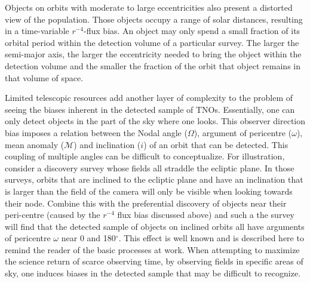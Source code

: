 \documentclass{aastex62}
\begin{document}
Objects on orbits with moderate to large eccentricities also present a distorted view of the population.  Those objects occupy a range of solar distances, resulting in a time-variable $r^{-4}$-flux bias. An object may only spend a small fraction of its orbital period within the detection volume of a particular survey. The larger the semi-major axis, the larger the eccentricity needed to bring the object within the detection volume and the smaller the fraction of the orbit that object remains in that volume of space.

Limited telescopic resources add another layer of complexity to the problem of seeing the biases inherent in the detected sample of TNOs.  Essentially, one can only detect objects in the part of the sky where one looks.  This observer direction bias imposes a relation between the Nodal angle ($\Omega$), argument of pericentre ($\omega$), mean anomaly ($\mathcal{M}$) and inclination ($i$) of an orbit that can be detected.  This coupling of multiple angles can be difficult to conceptualize.  For illustration, consider a discovery survey whose fields all straddle the ecliptic plane.  In those surveys,  orbits that are inclined to the ecliptic plane and have an inclination that is larger than the field of the camera will only be visible when looking towards their node. Combine this with the preferential discovery of objects near their peri-centre (caused by the $r^{-4}$ flux bias discussed above) and such a the survey will find that the detected sample of objects on inclined orbits all have arguments of pericentre $\omega$ near 0 and 180$^{\circ}$. This effect is well known and is described here to remind the reader of the basic processes at work.  When attempting to maximize the science return of scarce observing time, by observing fields in specific areas of sky, one induces biases in the detected sample that may be difficult to recognize. 
\end{document}
